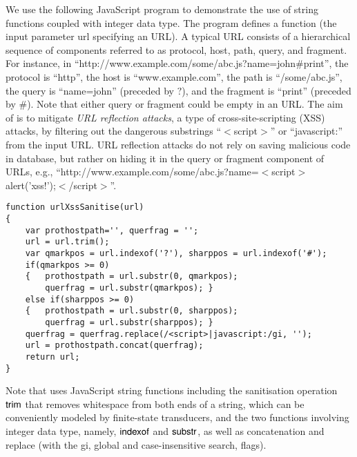 
\begin{example}
We use the following JavaScript program to demonstrate the use of string functions coupled with integer data type.
The program defines a function {\urlxsssanitise} (the input parameter url specifying an URL). A typical URL consists of a hierarchical sequence of components referred to as protocol, host, path, query, and fragment. For instance, in ``http://www.example.com/some/abc.js?name=john$\#$print'', the protocol is ``http'', the host is ``www.example.com'', the path is ``/some/abc.js'', the query is ``name=john'' (preceded by $?$), and the fragment is ``print'' (preceded by $\#$). Note that either query or fragment could be empty in an URL. The aim of {\urlxsssanitise} is to mitigate \emph{URL reflection attacks}, a type of cross-site-scripting (XSS) attacks, by filtering out the dangerous substrings ``$<$script$>$'' or ``javascript:'' from the input URL. URL reflection attacks  do not rely on saving malicious code in database, but rather on hiding it in the query or fragment component of URLs, e.g., ``http://www.example.com/some/abc.js?name=$<$script$>$alert('xss!');$<$/script$>$''.
{\small
\begin{verbatim}
function urlXssSanitise(url)
{
    var prothostpath='', querfrag = '';
    url = url.trim();
    var qmarkpos = url.indexof('?'), sharppos = url.indexof('#');
    if(qmarkpos >= 0) 
    {   prothostpath = url.substr(0, qmarkpos);
        querfrag = url.substr(qmarkpos); }
    else if(sharppos >= 0)
    {   prothostpath = url.substr(0, sharppos);
        querfrag = url.substr(sharppos); }
    querfrag = querfrag.replace(/<script>|javascript:/gi, '');
    url = prothostpath.concat(querfrag);
    return url;
}
\end{verbatim}
}
%
Note that {\urlxsssanitise} uses JavaScript string functions including the sanitisation operation $\sf trim$ that removes whitespace from both ends of a string, which can be conveniently modeled by finite-state transducers, and the two functions involving integer data type, namely, $\sf indexof$ and $\sf substr$, as well as concatenation and replace (with the gi, global and case-insensitive search, flags).



\end{example}
